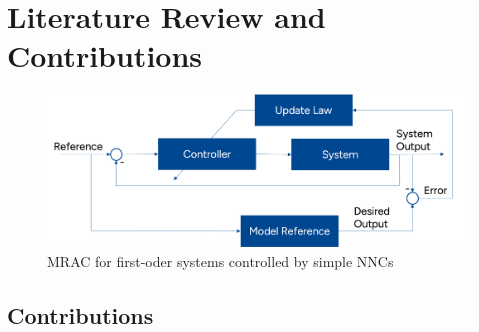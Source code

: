 \section{Literature Review and Contributions}



\begin{figure}[ht]
    \centering
    \includegraphics[width=0.8\linewidth]{images/MRAC_Blockdiagram.png}
    \caption{MRAC for first-oder systems controlled by simple NNCs}
    \label{fig:nonlinear-NNC-MRAC}
\end{figure}



\subsection{Contributions}
